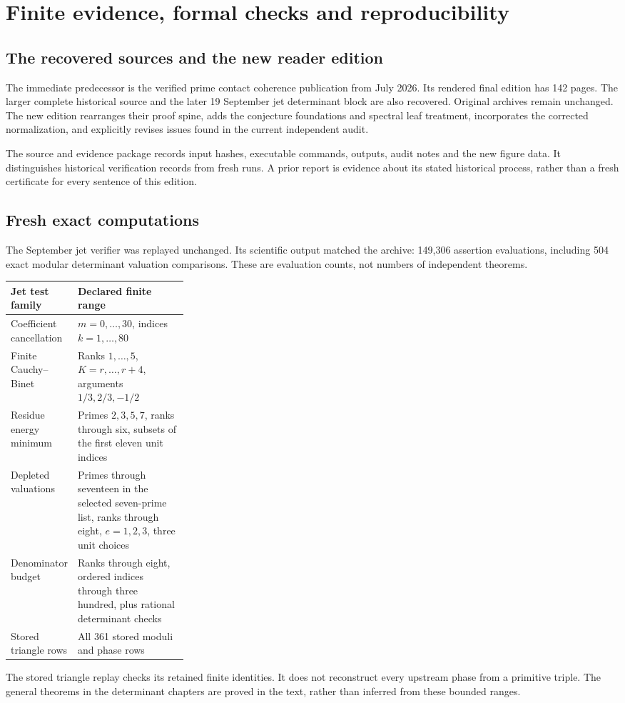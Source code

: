 \section{Finite evidence, formal checks and reproducibility}\label{sec:evidence}
\subsection{The recovered sources and the new reader edition}
The immediate predecessor is the verified prime contact coherence publication from July 2026. Its rendered final edition has 142 pages. The larger complete historical source and the later 19 September jet determinant block are also recovered. Original archives remain unchanged. The new edition rearranges their proof spine, adds the conjecture foundations and spectral leaf treatment, incorporates the corrected normalization, and explicitly revises issues found in the current independent audit.

The source and evidence package records input hashes, executable commands, outputs, audit notes and the new figure data. It distinguishes historical verification records from fresh runs. A prior report is evidence about its stated historical process, rather than a fresh certificate for every sentence of this edition.

\subsection{Fresh exact computations}
The September jet verifier was replayed unchanged. Its scientific output matched the archive: 149,306 assertion evaluations, including 504 exact modular determinant valuation comparisons. These are evaluation counts, not numbers of independent theorems.

\begin{center}
\begin{tabularx}{\linewidth}{@{}p{0.29\linewidth}X@{}}
\toprule
Jet test family & Declared finite range\\
\midrule
Coefficient cancellation & $m=0,\ldots,30$, indices $k=1,\ldots,80$\\
Finite Cauchy--Binet & Ranks $1,\ldots,5$, $K=r,\ldots,r+4$, arguments $1/3,2/3,-1/2$\\
Residue energy minimum & Primes $2,3,5,7$, ranks through six, subsets of the first eleven unit indices\\
Depleted valuations & Primes through seventeen in the selected seven-prime list, ranks through eight, $e=1,2,3$, three unit choices\\
Denominator budget & Ranks through eight, ordered indices through three hundred, plus rational determinant checks\\
Stored triangle rows & All 361 stored moduli and phase rows\\
\bottomrule
\end{tabularx}
\end{center}
The stored triangle replay checks its retained finite identities. It does not reconstruct every upstream phase from a primitive triple. The general theorems in the determinant chapters are proved in the text, rather than inferred from these bounded ranges.

